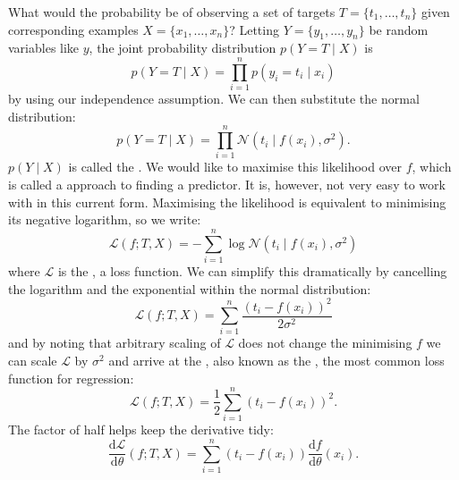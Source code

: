             What would the probability be of observing a set of targets $T = \{t_1, \dots, t_n\}$ given corresponding examples $X = \{x_1, \dots, x_n\}$? Letting $Y = \{y_1, \dots, y_n\}$ be random variables like $y$, the joint probability distribution $p(Y = T \mid X)$ is
            \begin{equation}
                p(Y = T \mid X) = \prod_{i = 1}^n p(y_i = t_i \mid x_i)
            \end{equation}
            by using our independence assumption. We can then substitute the normal distribution:
            \begin{equation}
                p(Y = T \mid X) = \prod_{i = 1}^n \mathcal N(t_i \mid f(x_i), \sigma^2).
            \end{equation}
            $p(Y \mid X)$ is called the . We would like to maximise this likelihood over $f$, which is called a  approach to finding a predictor. It is, however, not very easy to work with in this current form. Maximising the likelihood is equivalent to minimising its negative logarithm, so we write:
            \begin{equation}
                \mathcal L(f; T, X) = -\sum_{i = 1}^n \log \mathcal N(t_i \mid f(x_i), \sigma^2)
            \end{equation}
            where $\mathcal L$ is the , a loss function. We can simplify this dramatically by cancelling the logarithm and the exponential within the normal distribution:
            \begin{equation}
                \mathcal L(f; T, X) = \sum_{i = 1}^n \frac{(t_i - f(x_i))^2}{2\sigma^2}
            \end{equation}
        and by noting that arbitrary scaling of $\mathcal L$ does not change the minimising $f$ we can scale $\mathcal L$ by $\sigma^2$ and arrive at the , also known as the , the most common loss function for regression:
            \begin{equation}
                \mathcal L(f; T, X) = \frac{1}{2} \sum_{i = 1}^n (t_i - f(x_i))^2.
            \end{equation}
            The factor of half helps keep the derivative tidy:
            \begin{equation}
                \frac{\mathrm{d}\mathcal L}{\mathrm{d}\theta}(f; T, X) = \sum_{i = 1}^n (t_i - f(x_i)) \frac{\mathrm{d}f}{\mathrm{d}\theta}(x_i).
            \end{equation}

